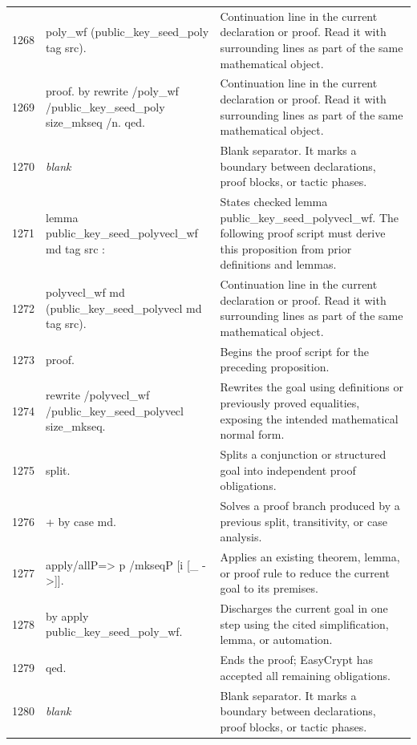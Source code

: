 \documentclass[10pt]{article}
\begin{document}
\begin{longtable}{r L{0.53\textwidth} L{0.37\textwidth}}
1268 & {\ttfamily\scriptsize   poly\_wf (public\_key\_seed\_poly tag src).} & Continuation line in the current declaration or proof.  Read it with surrounding lines as part of the same mathematical object. \\
1269 & {\ttfamily\scriptsize proof. by rewrite /poly\_wf /public\_key\_seed\_poly size\_mkseq /n. qed.} & Continuation line in the current declaration or proof.  Read it with surrounding lines as part of the same mathematical object. \\
1270 & {\ttfamily\scriptsize \emph{blank}} & Blank separator.  It marks a boundary between declarations, proof blocks, or tactic phases. \\
1271 & {\ttfamily\scriptsize lemma public\_key\_seed\_polyvecl\_wf md tag src :} & States checked lemma public\_key\_seed\_polyvecl\_wf.  The following proof script must derive this proposition from prior definitions and lemmas. \\
1272 & {\ttfamily\scriptsize   polyvecl\_wf md (public\_key\_seed\_polyvecl md tag src).} & Continuation line in the current declaration or proof.  Read it with surrounding lines as part of the same mathematical object. \\
1273 & {\ttfamily\scriptsize proof.} & Begins the proof script for the preceding proposition. \\
1274 & {\ttfamily\scriptsize rewrite /polyvecl\_wf /public\_key\_seed\_polyvecl size\_mkseq.} & Rewrites the goal using definitions or previously proved equalities, exposing the intended mathematical normal form. \\
1275 & {\ttfamily\scriptsize split.} & Splits a conjunction or structured goal into independent proof obligations. \\
1276 & {\ttfamily\scriptsize + by case md.} & Solves a proof branch produced by a previous split, transitivity, or case analysis. \\
1277 & {\ttfamily\scriptsize apply/allP=> p /mkseqP [i [\_ ->]].} & Applies an existing theorem, lemma, or proof rule to reduce the current goal to its premises. \\
1278 & {\ttfamily\scriptsize by apply public\_key\_seed\_poly\_wf.} & Discharges the current goal in one step using the cited simplification, lemma, or automation. \\
1279 & {\ttfamily\scriptsize qed.} & Ends the proof; EasyCrypt has accepted all remaining obligations. \\
1280 & {\ttfamily\scriptsize \emph{blank}} & Blank separator.  It marks a boundary between declarations, proof blocks, or tactic phases. \\

\end{longtable}
\end{document}
